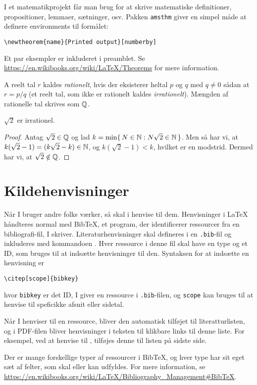 I et matematikprojekt får man brug for at skrive matematiske definitioner, propositioner, lemmaer, sætninger, osv.
Pakken \texttt{amsthm} giver en simpel måde at definere environments til formålet:
%
\begin{verbatim}
\newtheorem{name}{Printed output}[numberby]
\end{verbatim}
%
Et par eksempler er inkluderet i preamblet.
Se \url{https://en.wikibooks.org/wiki/LaTeX/Theorems} for mere information.
%
\begin{defn}
  A reelt tal \(r\) kaldes \emph{rationelt}, hvis der eksisterer heltal \(p\) og \(q\) med \(q \neq 0\) sådan at \(r = p/q\)
  (et reelt tal, som ikke er rationelt kaldes \emph{irrationelt}).
  Mængden af rationelle tal skrives som \(\mathbb{Q}\).
\end{defn}
%
\begin{thm}
  \(\sqrt{2}\) er irrationel.
\end{thm}
%
\begin{proof}
  Antag \(\sqrt{2} \in \mathbb{Q}\) og lad \(k = \min\{\, N \in \mathbb{N} : N\sqrt{2} \in \mathbb{N} \,\}\).
  Men så har vi, at \(k (\sqrt{2} - 1) = (k\sqrt{2} - k) \in \mathbb{N}\), og \(k(\sqrt{2} - 1) < k\), hvilket er en modstrid.
  Dermed har vi, at \(\sqrt{2} \notin \mathbb{Q}\).
\end{proof}


\section{Kildehenvisninger}
\label{sec:citations}

Når I bruger andre folks værker, så skal i henvise til dem.
Henvisninger i \LaTeX{} håndteres normal med BibTeX, et program, der identificerer ressourcer fra en bibliografi-fil, I skriver.
Literaturhenvisninger skal defineres i en \texttt{.bib}-fil og inkluderes med kommandoen \verb!!.
Hver ressource i denne fil skal have en type og et ID, som bruges til at indsætte henvisninger til den.
Syntaksen for at indsætte en henvisning er 
%
\begin{verbatim}
\citep[scope]{bibkey}
\end{verbatim}
%
hvor \texttt{bibkey} er det ID, I giver en ressource i \texttt{.bib}-filen, og \texttt{scope} kan bruges til at henvise til speficikke afsnit eller sidetal.

Når I henviser til en ressource, bliver den automatisk tilføjet til literatturlisten, og i PDF-filen bliver henvisninger i teksten til klikbare links til denne liste.
For eksempel, ved at henvise til \citep[s. 104-110]{edpenn}, tilføjes denne til listen på sidste side.

Der er mange forskellige typer af ressourcer i BibTeX, og hver type har sit eget sæt af felter, som skal eller kan udfyldes.
For mere information, se \url{https://en.wikibooks.org/wiki/LaTeX/Bibliography_Management#BibTeX}.
